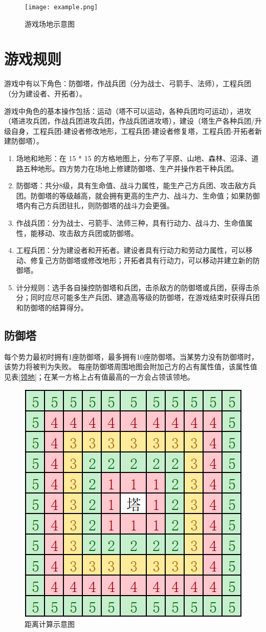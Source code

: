 \documentclass[a4paper,4pt]{article}
\begin{document}
\begin{figure}[htbp]   %
  \centering
  \texttt{[image: example.png]}
  \caption{游戏场地示意图}
  \label{jpg:示例图片1}
\end{figure}



\section{游戏规则}
游戏中有以下角色：防御塔，作战兵团（分为战士、弓箭手、法师），工程兵团（分为建设者、开拓者）。\par
游戏中角色的基本操作包括：运动（塔不可以运动，各种兵团均可运动），进攻（塔进攻兵团，作战兵团进攻兵团，作战兵团进攻塔），建设（塔生产各种兵团/升级自身，工程兵团-建设者修改地形，工程兵团-建设者修复塔，工程兵团-开拓者新建防御塔）。
\begin{enumerate}[fullwidth, itemindent=2em, label=(\arabic*)]
  \item 场地和地形：在 15 * 15 的方格地图上，分布了平原、山地、森林、沼泽、道路五种地形。四方势力在场地上修建防御塔、生产并操作若干种兵团。
  \item 防御塔：共分8级，具有生命值、战斗力属性，能生产己方兵团、攻击敌方兵团。防御塔的等级越高，就会拥有更高的生产力、战斗力、生命值；如果防御塔内有己方兵团驻扎，则防御塔的战斗力会更强。
  \item 作战兵团：分为战士、弓箭手、法师三种，具有行动力、战斗力、生命值属性，能移动、攻击敌方兵团或防御塔。
  \item 工程兵团：分为建设者和开拓者。建设者具有行动力和劳动力属性，可以移动、修复己方防御塔或修改地形；开拓者具有行动力，可以移动并建立新的防御塔。
  \item 计分规则：选手各自操控防御塔和兵团，击杀敌方的防御塔或兵团，获得击杀分；同时应尽可能多生产兵团、建造高等级的防御塔，在游戏结束时获得兵团和防御塔的结算得分。
\end{enumerate}
\par

\subsection{防御塔}
每个势力最初时拥有1座防御塔，最多拥有10座防御塔。当某势力没有防御塔时，该势力将被判为失败。
每座防御塔周围地图会附加己方的占有属性值，该属性值见表\ref{领地}；在某一方格上占有值最高的一方会占领该领地。
\begin{figure}[htbp]   %
  \centering
  \includegraphics[width=2.5 in]{距离.png}
  \caption{距离计算示意图}
  \label{jpg:示例图片2}
\end{figure}
\end{document}
